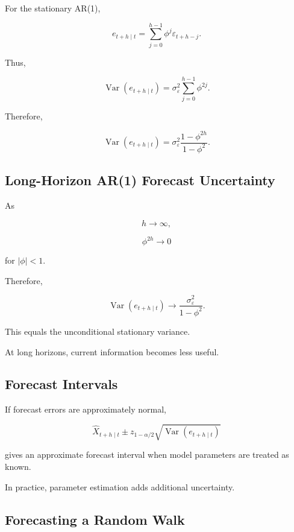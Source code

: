 For the stationary AR(1),

\[
e_{t+h\mid t}
=
\sum_{j=0}^{h-1}
\phi^j
\varepsilon_{t+h-j}.
\]

Thus,

\[
\boxed{
\operatorname{Var}
(
e_{t+h\mid t}
)
=
\sigma_\varepsilon^2
\sum_{j=0}^{h-1}
\phi^{2j}.
}
\]

Therefore,

\[
\boxed{
\operatorname{Var}
(
e_{t+h\mid t}
)
=
\sigma_\varepsilon^2
\frac{
1-\phi^{2h}
}{
1-\phi^2
}.
}
\]

\subsection{Long-Horizon AR(1) Forecast Uncertainty}
\label{subsec:ar1-long-horizon-uncertainty}

As

\[
h\to\infty,
\]

\[
\phi^{2h}\to0
\]

for \(|\phi|<1\).

Therefore,

\[
\boxed{
\operatorname{Var}
(
e_{t+h\mid t}
)
\to
\frac{
\sigma_\varepsilon^2
}{
1-\phi^2
}.
}
\]

This equals the unconditional stationary variance.

At long horizons, current information becomes less useful.

\subsection{Forecast Intervals}
\label{subsec:forecast-intervals-time-series}

If forecast errors are approximately normal,

\[
\boxed{
\widehat{X}_{t+h\mid t}
\pm
z_{1-\alpha/2}
\sqrt{
\operatorname{Var}
(
e_{t+h\mid t}
)
}
}
\]

gives an approximate forecast interval when model parameters are treated
as known.

In practice, parameter estimation adds additional uncertainty.

\subsection{Forecasting a Random Walk}
\label{subsec:random-walk-forecast}

